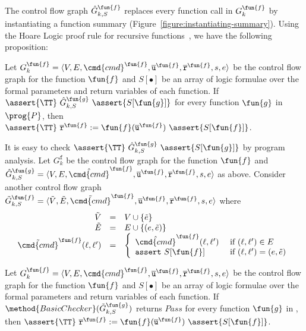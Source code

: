 The control flow graph $\hat{G}^{\fun{f}}_{k,S}$ replaces every
function call in $G_k^\fun{f}$ by instantiating a function
summary (Figure~\ref{figure:instantiating-summary}).
Using the Hoare Logic proof rule for recursive functions~\cite{Oheimb99}, we have the
following proposition:
\begin{proposition}
  \label{proposition:check_summary}
  Let $G^\fun{f}_k = \langle V, E, \cmd{cmd}^\fun{f}, \overline{\mathtt{u}}^\fun{f}, \overline{\mathtt{r}}^\fun{f},s,e \rangle$ be the control flow graph for the function
  $\fun{f}$ and $S[\bullet]$ be an array of logic formulae over the formal
  parameters and return variables of each function. If $\assert{\TT}\
  \hat{G}^\fun{g}_{k,S}\ \assert{S[\fun{g}]}$ for every
  function $\fun{g}$ in $\prog{P}$, then $\assert{\TT}\ \mathtt{\overline{r}}^\fun{f} :=
  \fun{f} (\overline{\mathtt{u}}^\fun{f})\ \assert{S[\fun{f}]}$.
\end{proposition}

It is easy to check $\assert{\TT}\ \hat{G}^\fun{g}_{k,S}\
\assert{S[\fun{g}]}$ by program analysis. Let $G_k^{\mathtt{f}}$ be
the control flow graph for the function $\fun{f}$ and
$\hat{G}^\fun{g}_{k,S} = \langle V, E, \hat{\cmd{cmd}}^\fun{f}, \overline{\mathtt{u}}^\fun{f}, \overline{\mathtt{r}}^\fun{f},s,e \rangle$ as
above. Consider another control flow graph $\tilde{G}^\fun{f}_{k,S} =
\langle \tilde{V}, \tilde{E}, \tilde{\cmd{cmd}}^\fun{f} , \overline{\mathtt{u}}^\fun{f}, \overline{\mathtt{r}}^\fun{f},s,e \rangle$ where
\begin{equation*}
  \begin{array}{rcl}
    \tilde{V} & = & V \cup \{ \tilde{e} \}\\
    \tilde{E} & = & E \cup \{ (e, \tilde{e}) \}\\
    \tilde{\cmd{cmd}}^\fun{f} (\ell, \ell') & = &
    \left\{
      \begin{array}{ll}
        \hat{\cmd{cmd}}^\fun{f} (\ell, \ell') &
        \text{ if } (\ell, \ell') \in E\\
        \mathtt{assert\ } S[\fun{f}] &
        \text{ if } (\ell, \ell') = (e, \tilde{e})
      \end{array}
    \right.
  \end{array}
\end{equation*}

\begin{corollary}
  Let $G^\fun{f}_k = \langle V, E, \cmd{cmd}^\fun{f}, \overline{\mathtt{u}}^\fun{f}, \overline{\mathtt{r}}^\fun{f},s,e \rangle$ be the control flow graph for the function
  $\fun{f}$ and $S[\bullet]$ be an array of logic formulae over the formal
  parameters and return variables of each function. If $\method{BasicChecker}
  (\tilde{G}^\fun{g}_{k,S})$ returns $\mathit{Pass}$ for every function
  $\fun{g}$ in \prog{P}, then $\assert{\TT}\ \mathtt{\overline{r}}^\fun{f} :=
  \fun{f} (\overline{\mathtt{u}}^\fun{f})\ \assert{S[\fun{f}]}$.
  \label{corollary:check-summary}
\end{corollary}


